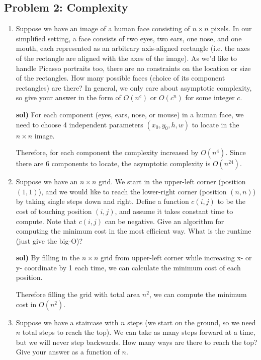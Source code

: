 \documentclass[a4paper]{article}
\begin{document}
\subsection*{Problem 2: Complexity}
    \begin{enumerate}[label=\alph*.]
        \setcounter{enumi}{0}
        \item Suppose we have an image of a human face consisting of $n \times n$ pixels.
        In our simplified setting, a face consists of two eyes, two ears, one nose, and one mouth,
        each represented as an arbitrary axis-aligned rectangle (i.e. the axes of the
        rectangle are aligned with the axes of the image).  As we'd like
        to handle Picasso portraits too, there are no constraints on the location or
        size of the rectangles.
        How many possible faces (choice of its component rectangles) are there?
        In general, we only care about asymptotic complexity,
        so give your answer in the form of $O(n^c)$ or $O(c^n)$ for some integer $c$.
        
        \medskip \textbf{sol)}
        For each component (eyes, ears, nose, or mouse) in a human face, we need to choose 4 independent parameters $(x_0, y_0, h, w)$ to locate in the $n \times n$ image.
        
        Therefore, for each component the complexity increased by $O(n^4)$. Since there are 6 components to locate, the asymptotic complexity is $O(n^24)$.

        \item Suppose we have an $n\times n$ grid.
        We start in the upper-left corner (position $(1,1)$), and we would like to reach the lower-right corner (position $(n,n)$) by taking single steps down and right.
        Define a function $c(i, j)$ to be the cost of touching position $(i, j)$, and assume it takes constant time to compute.
        Note that $c(i, j)$ can be negative.
        Give an algorithm for computing the minimum cost in the most efficient way.
        What is the runtime (just give the big-O)?

        \medskip \textbf{sol)}
        By filling in the $n\times n$ grid from upper-left corner while increasing x- or y- coordinate by 1 each time, we can calculate the minimum cost of each position. 
        
        Therefore filling the grid with total area $n^2$, we can compute the minimum cost in $O(n^2)$.


        \item Suppose we have a staircase with $n$ steps (we start on the ground, so we need $n$ total steps to reach the top).
        We can take as many steps forward at a time, but we will never step backwards.
        How many ways are there to reach the top?
        Give your answer as a function of $n$.
        

\end{enumerate}
\end{document}
